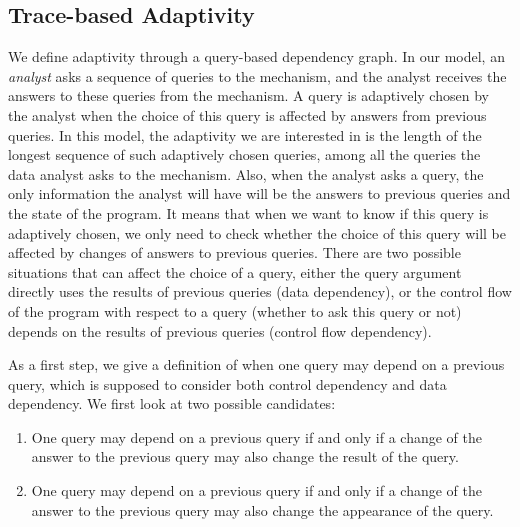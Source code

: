 {\subsection{ Trace-based Adaptivity}
%
We define adaptivity through a query-based dependency graph. In our model, an \emph{analyst} asks a sequence of queries to the mechanism, and the analyst receives the answers to these queries from the mechanism. A query is adaptively chosen by the analyst when the choice of this query is affected by answers from previous queries. In this model, the adaptivity we are interested in is the length of the longest sequence of such adaptively chosen queries, among all the queries the data analyst asks to the mechanism.  Also, when the analyst asks a query, the only information the analyst will have will be the answers to previous queries and the state of the program. It means that when we want to know if this query is adaptively chosen, we only need to check whether the choice of this query will be affected by changes of answers to previous queries. There are two possible situations that can  affect the choice of a query,  
either the query argument directly uses the results of previous queries (data dependency), or the control flow of the program with respect to a query (whether to ask this query or not) depends on the results of previous queries (control flow dependency).

{
As a first step, we give a definition of when one query may depend on a previous query, which is supposed to consider both control dependency and data dependency. We first look at two possible candidates:
\begin{enumerate}
    \item One query may depend on a previous query if and only if a change of the answer to the previous query may also change the result of the query.
    \item One query may depend on a previous query if and only if a change of the answer to the previous query may also change the appearance of the query.
\end{enumerate}
}

}
